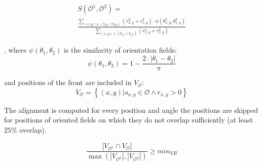 \begin{equation}
\begin{split}
S\left(\mathcal{O}^{1}, \mathcal{O}^{2}\right)=\\
\frac{\sum_{(x, y) \in\left(V_{\mathcal{O} 1} \cap V_{\mathcal{O} 2}\right)}\left(r_{x, y}^{y}+r_{x, y}^{2}\right) \cdot \psi\left(\theta_{x, y}^{1}, \theta_{x, y}^{2}\right)}{\sum_{(x, y) \in\left(V_{\mathcal{O}^{1}} \cap V_{\mathcal{O}^{2}}\right)}\left(r_{x, y}^{1}+r_{x, y}^{2}\right)}
\end{split}
\end{equation}

, where $\psi\left(\theta_{1}, \theta_{2}\right) $ is the similarity of orientation fields:
\begin{equation}
\psi\left(\theta_{1}, \theta_{2}\right)=1-\frac{2 \cdot\left|\theta_{1}-\theta_{2}\right|}{\pi}
\end{equation}

and positions of the front are included in $V_{\mathcal{O}}$:
\begin{equation}
V_{\mathcal{O}}=\left\{(x, y) | o_{x, y} \in \mathcal{O} \wedge r_{x, y}>0\right\}
\end{equation}\cite{morphing_paper}

The alignment is computed for every position and angle the positions are skipped for positions of oriented fields on which they do not overlap sufficiently (at least $25\%$ overlap).\cite{morphing_paper}

\begin{equation}
\frac{\left|V_{\mathcal{O}^{1}} \cap V_{\mathcal{O}}\right|}{\max \left(\left|V_{\mathcal{O}^{1} }\right|, | V_{\mathcal{O}^{2} }|\right)} \geq min_{V R}
\end{equation}\cite{morphing_paper}

